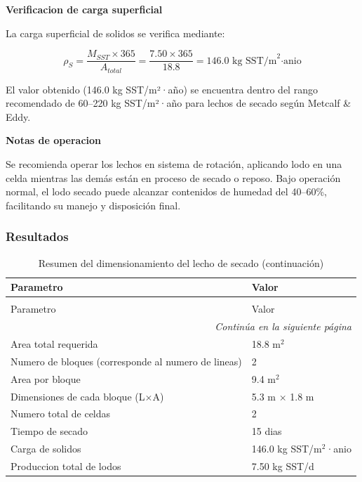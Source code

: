 \documentclass[12pt,a4paper]{article}
\begin{document}
\textbf{Verificacion de carga superficial}

La carga superficial de solidos se verifica mediante:

\begin{equation}
\rho_S = \frac{M_{SST} \times 365}{A_{total}} = \frac{7.50 \times 365}{18.8} = 146.0 \text{ kg SST/m}^2\text{·anio}
\end{equation}

El valor obtenido (146.0 kg SST/m²·año) se encuentra dentro del rango recomendado de 60--220 kg SST/m²·año para lechos de secado según Metcalf & Eddy.

\textbf{Notas de operacion}

Se recomienda operar los lechos en sistema de rotación, aplicando lodo en una celda mientras las demás están en proceso de secado o reposo. Bajo operación normal, el lodo secado puede alcanzar contenidos de humedad del 40--60\%, facilitando su manejo y disposición final.

\subsubsection{Resultados}

\begingroup
\small
\begin{longtable}{ll}
\caption{Resumen del dimensionamiento del lecho de secado}\\
\toprule
Parametro & Valor \\
\midrule
\endfirsthead
\caption[]{Resumen del dimensionamiento del lecho de secado (continuación)}\\
\toprule
Parametro & Valor \\
\midrule
\endhead
\midrule
\multicolumn{2}{r}{\textit{Continúa en la siguiente página}} \\
\endfoot
\bottomrule
\endlastfoot
Area total requerida & 18.8 m$^2$ \\
Numero de bloques (corresponde al numero de lineas) & 2 \\
Area por bloque & 9.4 m$^2$ \\
Dimensiones de cada bloque (L$\times$A) & 5.3 m $\times$ 1.8 m \\
Numero total de celdas & 2 \\
Tiempo de secado & 15 dias \\
Carga de solidos & 146.0 kg SST/m$^2$·anio \\
Produccion total de lodos & 7.50 kg SST/d \\
\end{longtable}
\endgroup
\end{document}
